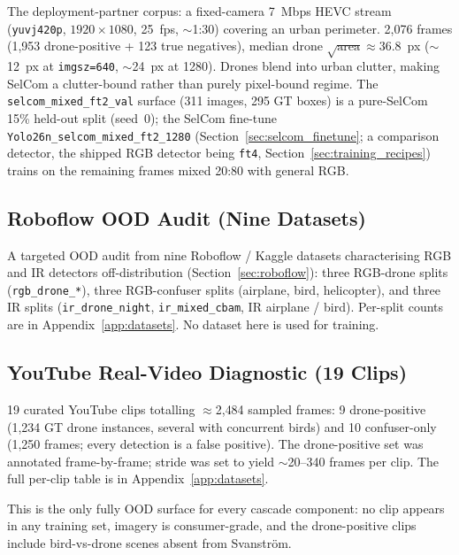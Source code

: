The deployment-partner corpus: a fixed-camera 7~Mbps HEVC stream (\texttt{yuvj420p}, $1920{\times}1080$, 25~fps, $\sim$1:30) covering an urban perimeter. 2{,}076 frames (1{,}953 drone-positive + 123 true negatives), median drone $\sqrt{\text{area}} \approx 36.8$~px ($\sim$12~px at \texttt{imgsz=640}, $\sim$24~px at 1280). Drones blend into urban clutter, making SelCom a clutter-bound rather than purely pixel-bound regime. The \texttt{selcom\_mixed\_ft2\_val} surface (311 images, 295 GT boxes) is a pure-SelCom 15\% held-out split (seed~0); the SelCom fine-tune \texttt{Yolo26n\_selcom\_mixed\_ft2\_1280} (Section~\ref{sec:selcom_finetune}; a comparison detector, the shipped RGB detector being \texttt{ft4}, Section~\ref{sec:training_recipes}) trains on the remaining frames mixed 20:80 with general RGB.

\subsection{Roboflow OOD Audit (Nine Datasets)}
\label{sec:ds_roboflow}

A targeted OOD audit from nine Roboflow / Kaggle datasets characterising RGB and IR detectors off-distribution (Section~\ref{sec:roboflow}): three RGB-drone splits (\texttt{rgb\_drone\_*}), three RGB-confuser splits (airplane, bird, helicopter), and three IR splits (\texttt{ir\_drone\_night}, \texttt{ir\_mixed\_cbam}, IR airplane / bird). Per-split counts are in Appendix~\ref{app:datasets}. No dataset here is used for training.

\subsection{YouTube Real-Video Diagnostic (19 Clips)}
\label{sec:ds_youtube}

19 curated YouTube clips totalling $\approx$2{,}484 sampled frames: 9 drone-positive (1{,}234 GT drone instances, several with concurrent birds) and 10 confuser-only (1{,}250 frames; every detection is a false positive). The drone-positive set was annotated frame-by-frame; stride was set to yield $\sim$20--340 frames per clip. The full per-clip table is in Appendix~\ref{app:datasets}.

This is the only fully OOD surface for every cascade component: no clip appears in any training set, imagery is consumer-grade, and the drone-positive clips include bird-vs-drone scenes absent from Svanstr\"om.

